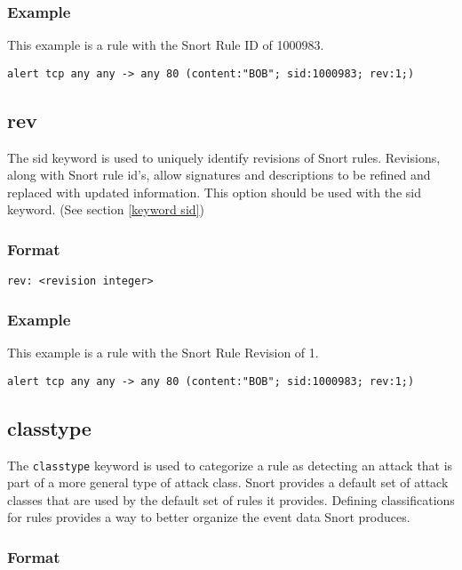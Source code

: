 \documentclass[english]{report}
\begin{document}
\subsubsection{Example}
This example is a rule with the Snort Rule ID of 1000983.
\begin{verbatim}
alert tcp any any -> any 80 (content:"BOB"; sid:1000983; rev:1;)
\end{verbatim}

\subsection{rev \label{keyword rev}}

The sid keyword is used to uniquely identify revisions of Snort rules.
Revisions, along with Snort rule id's, allow signatures and descriptions to be
refined and replaced with updated information.  This option should be used with
the sid keyword.  (See section \ref{keyword sid})

\subsubsection{Format}

\begin{verbatim}
rev: <revision integer>
\end{verbatim}

\subsubsection{Example}
This example is a rule with the Snort Rule Revision of 1.
\begin{verbatim}
alert tcp any any -> any 80 (content:"BOB"; sid:1000983; rev:1;)
\end{verbatim}

\subsection{classtype}

The \texttt{classtype} keyword is used to categorize a rule as detecting an attack that is
part of a more general type of attack class. Snort provides a default set of attack classes
that are used by the default set of rules it provides. Defining classifications for rules
provides a way to better organize the event data Snort produces.

\subsubsection{Format}
\end{document}
